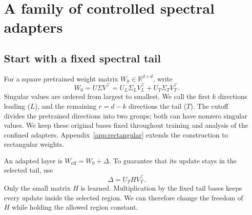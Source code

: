 \documentclass{article}
\begin{document}
\section{A family of controlled spectral adapters}
\label{sec:confinement}

\subsection{Start with a fixed spectral tail}
\label{sec:coordinates}
For a square pretrained weight matrix $W_0\in\mathbb R^{d\times d}$, write
\begin{equation}
W_0=U\Sigma V^\top=U_L\Sigma_LV_L^\top+U_T\Sigma_TV_T^\top.
\label{eq:pretrained}
\end{equation}
Singular values are ordered from largest to smallest. We call the first $k$ directions leading ($L$), and the remaining $r=d-k$ directions the tail ($T$). The cutoff divides the pretrained directions into two groups; both can have nonzero singular values. We keep these original bases fixed throughout training and analysis of the confined adapters. Appendix~\ref{app:rectangular} extends the construction to rectangular weights.

An adapted layer is $W_{\mathrm{eff}}=W_0+\Delta$. To guarantee that its update stays in the selected tail, use
\begin{equation}
\Delta=U_T H V_T^\top.
\label{eq:tailcore}
\end{equation}
Only the small matrix $H$ is learned. Multiplication by the fixed tail bases keeps every update inside the selected region. We can therefore change the freedom of $H$ while holding the allowed region constant.
\end{document}
